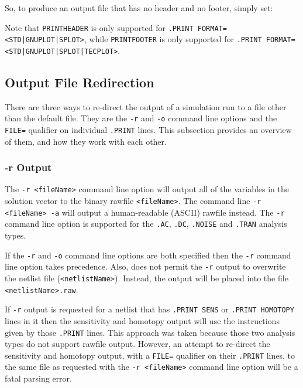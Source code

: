 So, to produce an output file that has no header and no footer, simply set:

Note that \texttt{PRINTHEADER} is only supported for \texttt{.PRINT FORMAT=<STD|GNUPLOT|SPLOT>},
while \texttt{PRINTFOOTER} is only supported for \texttt{.PRINT FORMAT=<STD|GNUPLOT|SPLOT|TECPLOT>}.

\subsection{Output File Redirection}
There are three ways to re-direct the output of a \Xyce{} simulation run
to a file other than the default file.  They are the \verb+-r+ and 
\verb+-o+ command line options and the \texttt{FILE=} qualifier on  
individual \texttt{.PRINT} lines.  This subsection provides an overview of 
them, and how they work with each other. 

\subsubsection{-r Output}
The \verb+-r <fileName>+ command line option will output all of the variables 
in the solution vector to the binary rawfile \verb+<fileName>+.  The
command line \verb+-r  <fileName> -a+ will output a human-readable (ASCII) 
rawfile instead.  The \verb+-r+ command line option is supported for the
\texttt{.AC}, \texttt{.DC}, \texttt{.NOISE} and \texttt{.TRAN} analysis
types.  

If the \verb+-r+ and \verb+-o+ command line options are both specified then 
the \verb+-r+ command line option takes precedence. Also, \Xyce{} does not
permit the \verb+-r+ output to overwrite the netlist file (\verb+<netlistName>+).
Instead, the output will be placed into the file \verb+<netlistName>.raw+.

If \verb+-r+ output is requested for a netlist that has \texttt{.PRINT SENS}
or \texttt{.PRINT HOMOTOPY} lines in it then the sensitivity and homotopy
output will use the instructions given by those \texttt{.PRINT} lines.  This
approach was taken because those two analysis types do not support rawfile 
output.  However, an attempt to re-direct the sensitivity and homotopy output,
with a \texttt{FILE=} qualifier on their \texttt{.PRINT} lines, to the same file
as requested with the \verb+-r <fileName>+ command line option will be a
fatal parsing error.

